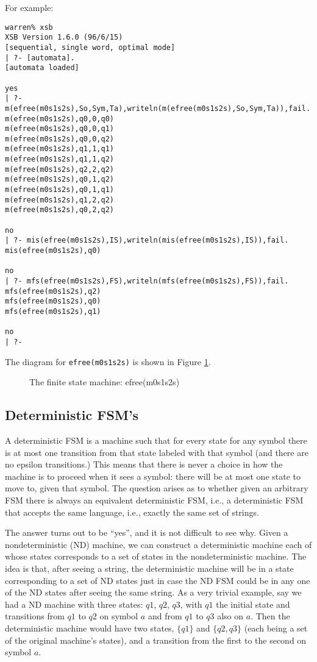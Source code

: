 For example:
\begin{verbatim}
warren% xsb
XSB Version 1.6.0 (96/6/15)
[sequential, single word, optimal mode]
| ?- [automata].
[automata loaded]

yes
| ?- m(efree(m0s1s2s),So,Sym,Ta),writeln(m(efree(m0s1s2s),So,Sym,Ta)),fail.
m(efree(m0s1s2s),q0,0,q0)
m(efree(m0s1s2s),q0,0,q1)
m(efree(m0s1s2s),q0,0,q2)
m(efree(m0s1s2s),q1,1,q1)
m(efree(m0s1s2s),q1,1,q2)
m(efree(m0s1s2s),q2,2,q2)
m(efree(m0s1s2s),q0,1,q2)
m(efree(m0s1s2s),q0,1,q1)
m(efree(m0s1s2s),q1,2,q2)
m(efree(m0s1s2s),q0,2,q2)

no
| ?- mis(efree(m0s1s2s),IS),writeln(mis(efree(m0s1s2s),IS)),fail.
mis(efree(m0s1s2s),q0)

no
| ?- mfs(efree(m0s1s2s),FS),writeln(mfs(efree(m0s1s2s),FS)),fail.
mfs(efree(m0s1s2s),q2)
mfs(efree(m0s1s2s),q0)
mfs(efree(m0s1s2s),q1)

no
| ?- 
\end{verbatim}

The diagram for \verb|efree(m0s1s2s)| is shown in Figure
\ref{efreem0s1s2s}.

\begin{figure}
\centerline{}
\caption{The finite state machine: efree(m0s1s2s)}\label{efreem0s1s2s}
\end{figure}


\subsection{Deterministic FSM's}

A deterministic FSM is a machine such that for every state for any
symbol there is at most one transition from that state labeled with
that symbol (and there are no epsilon transitions.)  This means that
there is never a choice in how the machine is to proceed when it sees
a symbol: there will be at most one state to move to, given that
symbol.  The question arises as to whether given an arbitrary FSM
there is always an equivalent deterministic FSM, i.e., a deterministic
FSM that accepts the same language, i.e., exactly the same set of
strings.

The answer turns out to be ``yes'', and it is not difficult to see
why.  Given a nondeterministic (ND) machine, we can construct a
deterministic machine each of whose states corresponds to a set of
states in the nondeterministic machine.  The idea is that, after
seeing a string, the deterministic machine will be in a state
corresponding to a set of ND states just in case the ND FSM could be
in any one of the ND states after seeing the same string.  As a very
trivial example, say we had a ND machine with three states: $q1$,
$q2$, $q3$, with $q1$ the initial state and transitions from $q1$ to
$q2$ on symbol $a$ and from $q1$ to $q3$ also on $a$.  Then the
deterministic machine would have two states, $\{q1\}$ and $\{q2,q3\}$
(each being a set of the original machine's states), and a transition
from the first to the second on symbol $a$.

